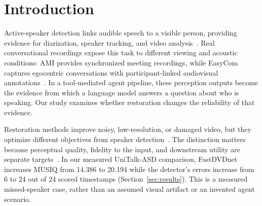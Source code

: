 \toggletrue{wacvfinal}\maketitle\togglefalse{wacvfinal}
\begin{abstract}
Multimodal agents use visual evidence to decide who is speaking, connect statements to people, and produce reports or actions. Video restoration changes that evidence before the agent receives it. A higher visual-quality score therefore answers only part of the relevant question: does the restored video still support the same speaker attribution? We study this problem through paired comparisons of captured and restored video, with the soundtrack held fixed. Our evaluation separates errors introduced by restoration from errors it corrects, and distinguishes perception errors from their propagation into an agent's answer. We propose \method, an assessment-and-repair framework that measures changes in audiovisual support and selectively retains restoration changes rather than accepting or rejecting an entire output. Its evaluation tests whether any attribution benefit survives controls for quality scores, confidence, disagreement, blending, and whole-output selection, at matched answer coverage.  The central objective is to assess restoration by both the quality it adds and the speaker evidence it preserves.
\end{abstract}

\section{Introduction}
Active-speaker detection links audible speech to a visible person, providing evidence for diarization, speaker tracking, and video analysis~\cite{ava,talknet,lightasd}. Real conversational recordings expose this task to different viewing and acoustic conditions: AMI provides synchronized meeting recordings, while EasyCom captures egocentric conversations with participant-linked audiovisual annotations~\cite{ami,easycom}. In a tool-mediated agent pipeline, these perception outputs become the evidence from which a language model answers a question about who is speaking. Our study examines whether restoration changes the reliability of that evidence.

Restoration methods improve noisy, low-resolution, or damaged video, but they optimize different objectives from speaker detection~\cite{fastdvd,fsrcnn,realbasic,codeformer}. The distinction matters because perceptual quality, fidelity to the input, and downstream utility are separate targets~\cite{cdi,hs,hallugen,taskguard}. In our measured UniTalk-ASD comparison, FastDVDnet increases MUSIQ from 14.386 to 20.194 while the detector's errors increase from 6 to 24 out of 24 scored timestamps (Section~\ref{sec:results}). This is a measured missed-speaker case, rather than an assumed visual artifact or an invented agent scenario.


